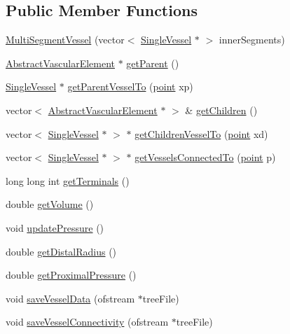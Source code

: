 \subsection*{Public Member Functions}
\begin{DoxyCompactItemize}
\item 
\hyperlink{class_multi_segment_vessel_aaebf85494977935ae1e0c48caf89b798}{Multi\+Segment\+Vessel} (vector$<$ \hyperlink{class_single_vessel}{Single\+Vessel} $\ast$ $>$ inner\+Segments)
\item 
\hyperlink{class_abstract_vascular_element}{Abstract\+Vascular\+Element} $\ast$ \hyperlink{class_multi_segment_vessel_acd12912a043c6c28ede419ab2f65d77f}{get\+Parent} ()
\item 
\hyperlink{class_single_vessel}{Single\+Vessel} $\ast$ \hyperlink{class_multi_segment_vessel_a3c2b7f69de853adfb6434c4e5566bea6}{get\+Parent\+Vessel\+To} (\hyperlink{structpoint}{point} xp)
\item 
vector$<$ \hyperlink{class_abstract_vascular_element}{Abstract\+Vascular\+Element} $\ast$ $>$ \& \hyperlink{class_multi_segment_vessel_a1822f40db542ad537c16499ca47ae09d}{get\+Children} ()
\item 
vector$<$ \hyperlink{class_single_vessel}{Single\+Vessel} $\ast$ $>$ $\ast$ \hyperlink{class_multi_segment_vessel_ad3220cc4fa66f851fd18b6126b250f1e}{get\+Children\+Vessel\+To} (\hyperlink{structpoint}{point} xd)
\item 
vector$<$ \hyperlink{class_single_vessel}{Single\+Vessel} $\ast$ $>$ $\ast$ \hyperlink{class_multi_segment_vessel_a7bf7eb14c3dbacf7e6fe6f9f00537d11}{get\+Vessels\+Connected\+To} (\hyperlink{structpoint}{point} p)
\item 
long long int \hyperlink{class_multi_segment_vessel_a5772718a4790089807df7b0f46f44c33}{get\+Terminals} ()
\item 
double \hyperlink{class_multi_segment_vessel_a1fdd2d4ed3fdd4e8cc62d4db6c390a27}{get\+Volume} ()
\item 
void \hyperlink{class_multi_segment_vessel_acd4b8dde6418dda9eaf3748e6ccbd0f1}{update\+Pressure} ()
\item 
double \hyperlink{class_multi_segment_vessel_ad0decc5c09f2ef4e58db122b4c511a65}{get\+Distal\+Radius} ()
\item 
double \hyperlink{class_multi_segment_vessel_a8617911dd4618bc9d75a27c894f8b66d}{get\+Proximal\+Pressure} ()
\item 
void \hyperlink{class_multi_segment_vessel_a870497c0529f2af9722f1a4a3d9d874d}{save\+Vessel\+Data} (ofstream $\ast$tree\+File)
\item 
void \hyperlink{class_multi_segment_vessel_abf6e7a21a7b57f770723050515f1bd00}{save\+Vessel\+Connectivity} (ofstream $\ast$tree\+File)
\end{DoxyCompactItemize}
